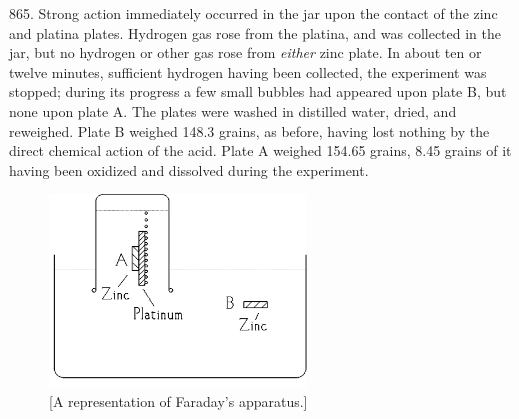 865. Strong action immediately occurred in the jar upon the contact of
the zinc and platina plates. Hydrogen gas rose from the platina, and was
collected in the jar, but no hydrogen or other gas rose from
\emph{either} zinc plate. In about ten or twelve minutes, sufficient
hydrogen having been collected, the experiment was stopped; during its
progress a few small bubbles had appeared upon plate B, but none upon
plate A. The plates were washed in distilled water, dried, and
reweighed. Plate B weighed 148.3 grains, as before, having lost nothing
by the direct chemical action of the acid. Plate A weighed 154.65
grains, 8.45 grains of it having been oxidized and dissolved during the
experiment.

\begin{figure}
  \begin{center}
    \includegraphics[width=2.68681in,height=2.00903in]{images/01_faraday/image001.png}
    \caption*{{[}A representation of Faraday's ap\-pa\-ra\-tus.{]}}
  \end{center}
\end{figure}

